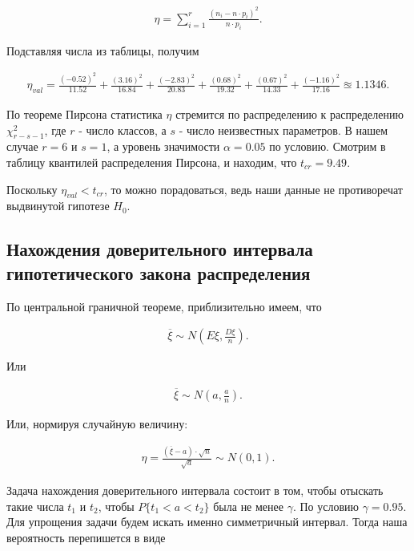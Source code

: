 \documentclass[14pt,a4paper]{scrartcl}
\theoremstyle{definition}
\theoremstyle{remark}
\theoremstyle{definition}
\theoremstyle{definition}
\begin{document}
\begin{align*}
  \eta = \sum_{i=1}^{r} \frac{(n_{i} - n\cdot p_{i})^2}{n\cdot p_{i}}.
\end{align*}

Подставляя числа из таблицы, получим

\begin{align*}
  \eta_{val} = \frac{(-0.52)^2}{11.52} + \frac{(3.16)^2}{16.84} + \frac{(-2.83)^2}{20.83} + \frac{(0.68)^2}{19.32} + \frac{(0.67)^2}{14.33} + \frac{(-1.16)^2}{17.16} \approxeq 1.1346.
\end{align*}

По теореме Пирсона статистика $\eta$ стремится по распределению к распределению $\chi_{r-s-1}^2$, где $r$ - число классов, а $s$ - число неизвестных параметров. В нашем случае $r = 6$ и $s = 1$, а уровень значимости $\alpha = 0.05$ по условию. Смотрим в таблицу квантилей распределения Пирсона, и находим, что $t_{cr} = 9.49.$

Поскольку $\eta_{val} < t_{cr}$, то можно порадоваться, ведь наши данные не противоречат выдвинутой гипотезе $H_{0}$.

\subsection{Нахождения доверительного интервала гипотетического закона распределения}

По центральной граничной теореме, приблизительно имеем, что

\begin{align*}
  \overline{\xi} \sim N(E\xi, \frac{D\xi}{n}).
\end{align*}

Или

\begin{align*}
  \overline{\xi} \sim N(a, \frac{a}{n}).
\end{align*}

Или, нормируя случайную величину:

\begin{align*}
  \eta = \frac{(\overline{\xi}-a)\cdot \sqrt{n}}{\sqrt{a}} \sim N(0, 1).
\end{align*}

Задача нахождения доверительного интервала состоит в том, чтобы отыскать такие числа $t_{1}$ и $t_{2}$, чтобы $P\{t_{1} < a < t_{2}\}$ была не менее $\gamma$. По условию $\gamma = 0.95$. Для упрощения задачи будем искать именно симметричный интервал. Тогда наша вероятность перепишется в виде
\end{document}
